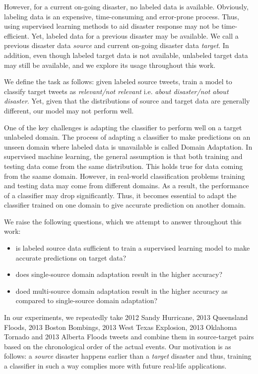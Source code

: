 However, for a current on-going disaster, no labeled data is available. Obviously, labeling data is an expensive, time-consuming and error-prone process. Thus, using supervised learning methods to aid disaster response may not be time-efficient. Yet, labeled data for a previous disaster may be available. We call a previous disaster data \textit{source} and current on-going disaster data \textit{target}. In addition, even though labeled target data is not available, unlabeled target data may still be available, and we explore its usage throughout this work.

We define the task as follows: given labeled source tweets, train a model to classify target tweets as \textit{relevant/not relevant} i.e. \textit{about disaster/not about disaster}. Yet, given that the distributions of source and target data are generally different, our model may not perform well. 

One of the key challenges is adapting the classifier to perform well on a target unlabeled domain. The process of adapting a classifier to make predictions on an unseen domain where labeled data is unavailable is called Domain Adaptation. In supervised machine learning, the general assumption is that both training and testing data come from the same distribution. This holds true for data coming from the saame domain. However, in real-world classification problems training and testing data may come from different domains. As a result, the performance of a classifier may drop significantly. Thus, it becomes essential to adapt the classifier trained on one domain to give accurate prediction on another domain. 

We raise the following questions, which we attempt to answer throughout this work:

\begin{itemize}
  \item is labeled source data sufficient to train a supervised learning model to make accurate predictions on target data?
  \item does single-source domain adaptation result in the higher accuracy?
  \item doed multi-source domain adaptation result in the higher accuracy as compared to single-source domain adaptation?
\end{itemize}

In our experiments, we repeatedly take 2012 Sandy Hurricane, 2013 Queensland Floods, 2013 Boston Bombings, 2013 West Texas Explosion, 2013 Oklahoma Tornado and 2013 Alberta Floods tweets and combine them in source-target pairs based on the chronological order of the actual events. Our motivation is as follows: a \textit{source} disaster happens earlier than a \textit{target} disaster and thus, training a classifier in such a way complies more with future real-life applications.